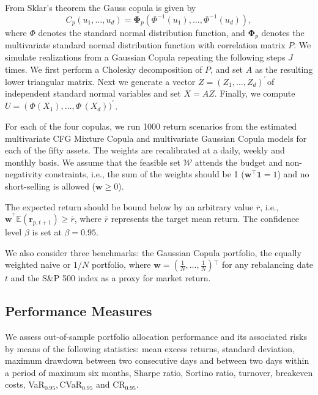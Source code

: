 \documentclass[a4paper,10pt]{article}
\begin{document}
From Sklar's theorem the Gauss copula is given by \begin{equation}C_{p}\left (u_{1},\ldots,u_{d}\right ) =\mathbf{\Phi }_{p}\left (\Phi ^{ -1}(u_{1}),\ldots,\Phi ^{ -1}(u_{d})\right ),
\end{equation}
where $\Phi $ denotes the standard normal distribution function, and $\mathbf{\Phi }_{p}$ denotes the multivariate standard normal distribution function with correlation matrix $P$. We simulate realizations from a Gaussian Copula repeating the following steps $J$ times. We first perform a Cholesky decomposition of $P$, and set $A$ as the resulting lower triangular matrix. Next we generate a vector $Z =\left (Z_{1},\ldots,Z_{d}\right )^{ \prime ^{\,}}$of independent standard normal variables and set $X =AZ$. Finally, we compute $U =\left (\Phi (X_{1})\right .,\ldots,\Phi ^{\,}(X_{d}))^{ \prime ^{\,}}$.

For each of the four copulas, we run 1000 return scenarios from the estimated multivariate CFG Mixture Copula and multivariate Gaussian Copula models for each of the fifty assets. The weights are recalibrated at a daily, weekly and monthly basis. We assume that the feasible set $\mathcal{W}$ attends the budget and non-negativity constraints, i.e., the sum of the weights should be 1  ($\mathbf{w}^{\top }\mathbf{1=}1$) and no short-selling is allowed ($\mathbf{w\geq }0$).

The expected return should be bound below by an arbitrary value $\overline{r}$, i.e., $\mathbf{w}^{^{\top }}\mathbb{E}\left( \mathbf{r}_{p,t+1}\right) \mathbf{\geq }\overline{r}$, where $\overline{r}$ represents the target mean return. The confidence level $\beta $ is
set at $\beta =0.95$.

We also consider three benchmarks: the Gaussian Copula portfolio, the equally weighted naive or $1/N$ portfolio, where $\mathbf{w=}\left( \frac{1}{N},\ldots,\frac{1}{N}\right) {^{\top }}$ for
any rebalancing date $t$ and the S\&P 500 index as a proxy for market return.


\subsection{Performance Measures}

We assess out-of-sample portfolio allocation performance and its associated risks by means of the following statistics: mean excess returns, standard deviation, maximum drawdown between two consecutive days and between two days within a period of maximum six months, Sharpe ratio, Sortino ratio, turnover, breakeven costs, VaR$_{0.95}, $CVaR$_{0.95}$ and CR$_{0.95}$.
\end{document}
